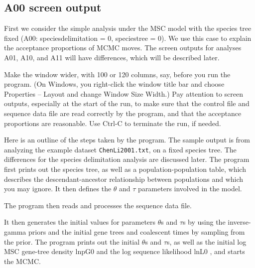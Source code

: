 \documentclass{book}
\numberwithin{equation}{section} \renewcommand{\baselinestretch}{0.55}
\begin{document}
\subsection{A00 screen output}

First we consider the simple analysis under the MSC model with the
species tree fixed (A00: speciesdelimitation = 0, speciestree = 0).
We use this case to explain the acceptance proportions of MCMC moves.
The screen outputs for analyses A01, A10, and A11 will have
differences, which will be described later.

Make the window wider, with 100 or 120 columns, say, before you run
the program.  (On Windows, you right-click the window title bar and
choose Properties – Layout and change Window Size Width.)  Pay
attention to screen outputs, especially at the start of the run, to
make sure that the control file and sequence data file are read
correctly by the program, and that the acceptance proportions are
reasonable.  Use Ctrl-C to terminate the run, if needed.

Here is an outline of the steps taken by the program.  The sample
output is from analyzing the example dataset \texttt{ChenLi2001.txt},
on a fixed species tree.  The differences for the species delimitation
analysis are discussed later.  The program first prints out the
species tree, as well as a population-population table, which
describes the descendant-ancestor relationship between populations and
which you may ignore.  It then defines the $\theta$ and $\tau$
parameters involved in the model.

The program then reads and processes the sequence data file.

It then generates the initial values for parameters $\theta$s and
$\tau$s by using the inverse-gamma priors and the initial gene trees
and coalescent times by sampling from the prior.  The program prints
out the initial $\theta$s and $\tau$s, as well as the initial log MSC
gene-tree density lnpG0 \citep{Rannala2003} and the log sequence
likelihood lnL0 \citep{Felsenstein1981}, and starts the MCMC.
\end{document}
